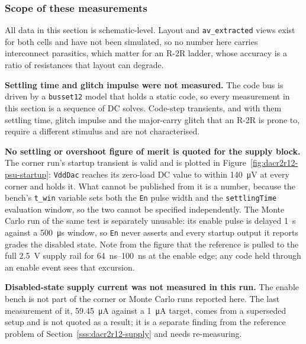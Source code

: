 %

\subsubsection{Scope of these measurements}\label{sss:dacr2r12-scope}

All data in this section is schematic-level. Layout and \texttt{av\_extracted} views
exist for both cells and have not been simulated, so no number here carries interconnect
parasitics, which matter for an R-2R ladder, whose accuracy is a ratio of resistances
that layout can degrade.

\textbf{Settling time and glitch impulse were not measured.} The code bus is driven by a
\texttt{busset12} model that holds a static code, so every measurement in this section is
a sequence of DC solves. Code-step transients, and with them settling time, glitch
impulse and the major-carry glitch that an R-2R is prone to, require a different
stimulus and are not characterised.

\textbf{No settling or overshoot figure of merit is quoted for the supply block.} The
corner run's startup transient is valid and is plotted in
Figure~\ref{fig:dacr2r12-psu-startup}: \texttt{VddDac} reaches its zero-load DC value to
within \SI{140}{\micro\volt} at every corner and holds it. What cannot be published from
it is a number, because the bench's \texttt{t\_win} variable sets both the \texttt{En}
pulse width and the \texttt{settlingTime} evaluation window, so the two cannot be
specified independently. The Monte Carlo run of the same test is separately unusable: its
enable pulse is delayed \SI{1}{\second} against a \SI{500}{\micro\second} window, so
\texttt{En} never asserts and every startup output it reports grades the disabled state.
Note from the figure that the reference is pulled to the full \SI{2.5}{\volt} supply rail
for \SIrange{64}{100}{\nano\second} at the enable edge; any code held through an enable
event sees that excursion.

\textbf{Disabled-state supply current was not measured in this run.} The enable bench is
not part of the corner or Monte Carlo runs reported here. The last measurement of it,
\SI{59.45}{\micro\ampere} against a \SI{1}{\micro\ampere} target, comes from a superseded
setup and is not quoted as a result; it is a separate finding from the reference problem
of Section~\ref{sss:dacr2r12-supply} and needs re-measuring.


